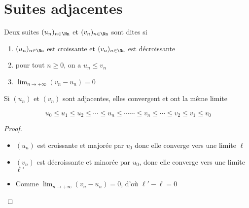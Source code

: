 \section{Suites adjacentes}


\begin{frame}
\begin{mydefinition}
Deux suites $(u_n)_{n\in \Nn}$ et $(v_n)_{n\in \Nn}$ sont dites  si
\begin{enumerate}
  \item $(u_n)_{n\in \Nn}$ est croissante et $(v_n)_{n\in \Nn}$ est décroissante
  \item pour tout $n\geq 0$, on a $u_n\leq v_n$
  \item $\lim_{n\to +\infty} (v_n -u_n) = 0$
\end{enumerate}
\end{mydefinition}

\pause
\medskip

\begin{theoreme}
Si $(u_n)$ et $(v_n)$ sont adjacentes, 
  elles convergent et ont la même limite
\end{theoreme}

\pause

$$u_0 \le u_1 \le u_2 \le \cdots \le u_n \le \cdots \cdots \le v_n\le \cdots \le v_2 \le v_1 \le v_0$$

\pause

\begin{proof}
  \begin{itemize}
    \item $(u_n)$ est croissante et majorée par $v_0$ donc elle converge vers une limite $\ell$
\pause
    \item $(v_n)$ est décroissante et minorée par $u_0$, donc elle converge vers une limite $\ell'$
\pause
    \item Comme $\lim_{n\to +\infty} (v_n -u_n) = 0$, d'où $\ell'-\ell=0$ \qedhere
  \end{itemize}
\end{proof}
	
\end{frame}


